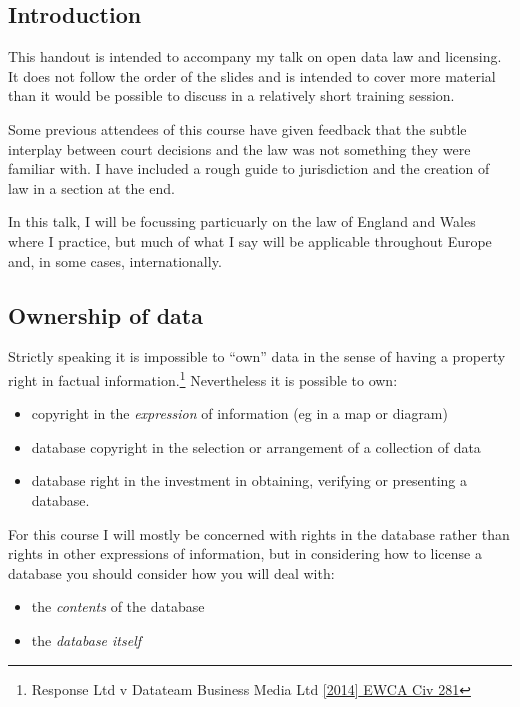 \subsection{Introduction}\label{introduction}

This handout is intended to accompany my talk on open data law and
licensing. It does not follow the order of the slides and is intended to
cover more material than it would be possible to discuss in a relatively
short training session.

Some previous attendees of this course have given feedback that the
subtle interplay between court decisions and the law was not something
they were familiar with. I have included a rough guide to jurisdiction
and the creation of law in a section at the end.

In this talk, I will be focussing particuarly on the law of England and
Wales where I practice, but much of what I say will be applicable
throughout Europe and, in some cases, internationally.

\subsection{Ownership of data}\label{ownership-of-data}

Strictly speaking it is impossible to ``own'' data in the sense of
having a property right in factual information.\footnote{Response Ltd v
  Datateam Business Media Ltd
  \href{http://www.bailii.org/ew/cases/EWCA/Civ/2014/281.html}{{[}2014{]}
  EWCA Civ 281}} Nevertheless it is possible to own:

\begin{itemize}
\itemsep1pt\parskip0pt
\item
  copyright in the \emph{expression} of information (eg in a map or
  diagram)
\item
  database copyright in the selection or arrangement of a collection of
  data
\item
  database right in the investment in obtaining, verifying or presenting
  a database.
\end{itemize}

For this course I will mostly be concerned with rights in the database
rather than rights in other expressions of information, but in
considering how to license a database you should consider how you will
deal with:

\begin{itemize}
\itemsep1pt\parskip0pt
\item
  the \emph{contents} of the database
\item
  the \emph{database itself}
\end{itemize}


